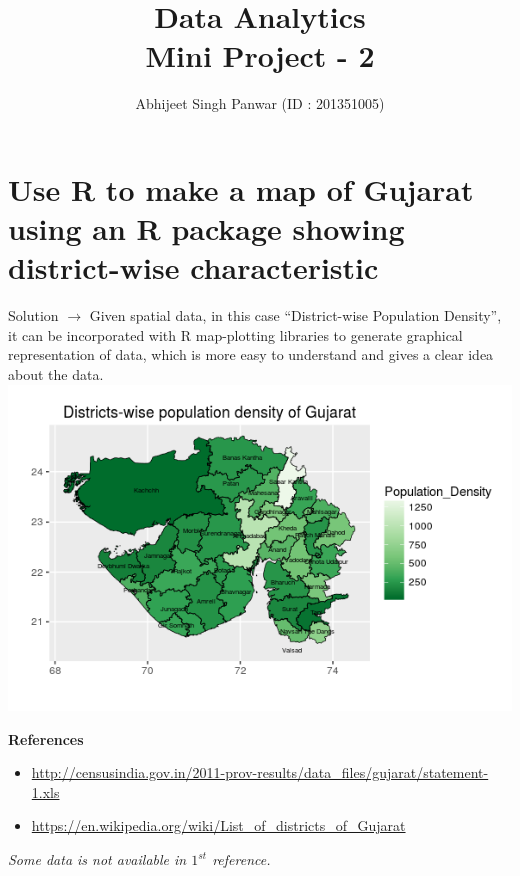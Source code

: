 \documentclass[12pt,a4paper]{report}
\author{Abhijeet Singh Panwar (ID : 201351005)}
\title{Data Analytics\\ Mini Project - 2}
\date{\parbox{\linewidth}{\centering%
  \today\endgraf\bigskip
  Instructor : \endgraf\medskip
  Prof. Bhargab Chattopadhyay\endgraf\bigskip
  Indian Institute of Information Technology, Vadodara}}
\begin{document}
\maketitle
\newpage
\section{Use R to make a map of Gujarat using an R package showing district-wise characteristic}

Solution $\rightarrow$ Given spatial data, in this case \enquote{District-wise Population Density}, it can be incorporated with R map-plotting libraries to generate graphical representation of data, which is more easy to understand and gives a clear idea about the data.
\\

\includegraphics[scale=1]{q1.png}


\textbf{References}
\begin{itemize}
\item \url{http://censusindia.gov.in/2011-prov-results/data_files/gujarat/statement-1.xls}
\item \url{https://en.wikipedia.org/wiki/List_of_districts_of_Gujarat}
\end{itemize}

\textit{Some data is not available in $1^{st}$ reference.}
\end{document}

